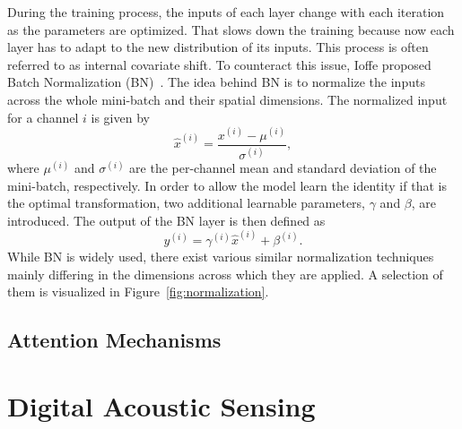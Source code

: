 During the training process, the inputs of each layer change with each iteration as the parameters are optimized.
That slows down the training because now each layer has to adapt to the new distribution of its inputs. This process is
often referred to as internal covariate shift.
To counteract this issue, Ioffe \etal proposed Batch Normalization (BN)~\cite{BatchNorm}.
The idea behind BN is to normalize the inputs across the whole mini-batch and their spatial dimensions.
The normalized input for a channel $i$ is given by
\begin{equation}
    \hat{x}^{(i)} = \frac{x^{(i)} - \mu^{(i)}}{\sigma^{(i)}},
\end{equation} 
where $\mu^{(i)}$ and $\sigma^{(i)}$ are the per-channel mean and standard deviation of the mini-batch, respectively.  
In order to allow the model learn the identity if that is the optimal transformation, two additional learnable
parameters, $\gamma$ and $\beta$, are introduced. The output of the BN layer is then defined as
\begin{equation}
    y^{(i)} = \gamma^{(i)}\hat{x}^{(i)} + \beta^{(i)}.
\end{equation}
While BN is widely used, there exist various similar normalization techniques~\cite{LayerNorm, InstanceNorm, GroupNorm}
mainly differing in the dimensions across which they are applied.
A selection of them is visualized in Figure~\ref{fig:normalization}.


\subsection{Attention Mechanisms}

\section{Digital Acoustic Sensing}
